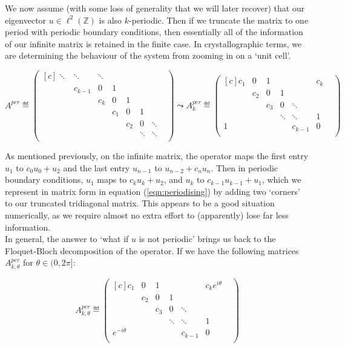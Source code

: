 \documentclass[../main.tex]{subfiles}
\begin{document}
We now assume (with some loss of generality that we will later recover) that our eigenvector $u \in \ell^2(\mathbb{Z})$ is also $k$-periodic. Then if we truncate the matrix to one period with periodic boundary conditions, then essentially all of the information of our infinite matrix is retained in the finite case. In crystallographic terms, we are determining the behaviour of the system from zooming in on a `unit cell'.

\begin{equation}\label{eqn:periodising}
A^{per} \eqdef
\begin{pmatrix*}[c]
\ddots & \ddots & \ddots & & & &\\
& c_{k-1} & 0 & 1 & & & &\\
& & c_{k} & 0 & 1 & & &\\
& & & c_1 & 0 & 1 & \\
& &&  & c_2 & 0 & \ddots \\
& & & & & \ddots & \ddots & \\
\end{pmatrix*}
\leadsto A^{per}_k \eqdef
\begin{pmatrix*}[c]
c_1 & 0 & 1 & & & c_{k}\\
& c_2 & 0 & 1 & & & \\
& & c_3 & 0 & \ddots & & \\
& & & \ddots & \ddots & 1 & \\
1 & & & & c_{k-1} & 0\\
\end{pmatrix*}
\end{equation}

As mentioned previously, on the infinite matrix, the operator maps the first entry $u_1$ to $c_0 u_0 + u_2$ and the last entry $u_{n-1}$ to $u_{n-2} + c_{n} u_{n}$. Then in periodic boundary conditions, $u_1$ maps to $c_k u_k + u_2$, and  $u_{k}$ to $c_{k-1} u_{k-1} + u_{1}$, which we represent in matrix form in equation (\ref{eqn:periodising}) by adding two `corners' to our truncated tridiagonal matrix. This appears to be a good situation numerically, as we require almost no extra effort to (apparently) lose far less information.\\

In general, the answer to `what if $u$ is not periodic' brings us back to the Floquet-Bloch decomposition of the operator. If we have the following matrices $A^{per}_{k, \theta}$ for $\theta \in (0, 2 \pi]$:

$$
A^{per}_{k, \theta} \eqdef
\begin{pmatrix*}[c]
c_1 & 0 & 1 & & & c_{k} e^{i \theta}\\
& c_2 & 0 & 1 & & & \\
& & c_3 & 0 & \ddots & & \\
& & & \ddots & \ddots & 1 & \\
e^{- i \theta} & & & & c_{k-1} & 0\\
\end{pmatrix*}
$$
\end{document}
